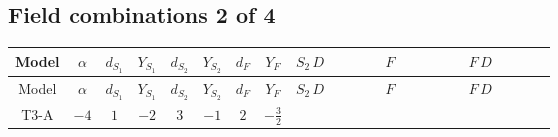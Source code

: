 \documentclass[8pt]{article}
\begin{document}
\begin{landscape}
\subsection*{Field combinations 2 of 4}
\begin{longtable}{@{}cccccccc >{\raggedright\arraybackslash}p{0.21\linewidth} >{\raggedright\arraybackslash}p{0.21\linewidth} >{\raggedright\arraybackslash}p{0.21\linewidth}@{}}
\toprule
Model & $\alpha$ & $d_{S_1}$ & $Y_{S_1}$ & $d_{S_2}$ & $Y_{S_2}$ & $d_F$ & $Y_F$ & $S_2\,D$ & $F$ & $F\,D$ \\
\midrule
\endfirsthead
\toprule
Model & $\alpha$ & $d_{S_1}$ & $Y_{S_1}$ & $d_{S_2}$ & $Y_{S_2}$ & $d_F$ & $Y_F$ & $S_2\,D$ & $F$ & $F\,D$ \\
\midrule
\endhead
T3-A & $-4$ & $1$ & $-2$ & $3$ & $-1$ & $2$ & $-\frac{3}{2}$ & \scriptsize\adjustbox{max width=\linewidth}{$\begin{gathered} +D_{\mu _1}\left(S_{2,j_1}\right){}^{\dagger } D_{\mu _1}\left(S_{2,j_1}\right)\end{gathered}$} & \scriptsize\adjustbox{max width=\linewidth}{$\begin{gathered} -\overline{F_{j_1,r_1}}\, F_{j_1,r_1} M_F\end{gathered}$} & \scriptsize\adjustbox{max width=\linewidth}{$\begin{gathered} +i \overline{F_{j_1,r_1}}\, \gamma ^{\mu _1}\, D_{\mu _1}\left(F_{j_1,r_1}\right)\end{gathered}$} \\
\midrule
\bottomrule
\end{longtable}
\clearpage

\end{landscape}
\end{document}
